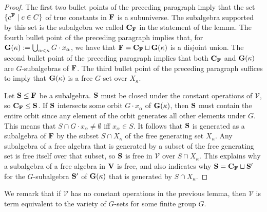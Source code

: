 \documentclass[12pt]{amsart}
\theoremstyle{definition}
\numberwithin{equation}{section}
\newcommand{\m}[1]{{\mathbf{\uppercase{#1}}}}
\begin{document}
\begin{proof}
The first two bullet points of the preceding paragraph
imply that the set $\{c^{\m f}\;|\;c\in C\}$ of true
constants in $\m f$ is a subuniverse.
The subalgebra supported by this set is the subalgebra we called
$\m c_{\m f}$ in the statement of the lemma.
The fourth bullet point of the preceding paragraph
implies that, for $\m g(\kappa):=\bigcup_{\alpha<\kappa} G\cdot x_{\alpha}$,
we have that
$\m f = \m c_{\m f}\sqcup \m g(\kappa)$
is a disjoint union. The second bullet point of the preceding paragraph
implies that both $\m c_{\m f}$ and $\m g(\kappa)$
are $G$-subalgebras of $\m f$. The third
bullet point of the preceding paragraph suffices to imply that
$\m g(\kappa)$
is a free $G$-set over
$X_{\kappa}$.

Let $\m s\leq \m f$ be a subalgebra. $\m s$ must be closed under
the constant operations of $\mathcal{V}$,
so $\m c_{\m f}\leq \m s$. If $\m s$ intersects
some orbit $G\cdot x_{\alpha}$ of $\m g(\kappa)$,
then $\m s$ must contain the entire orbit
since any element of the orbit generates
all other elements under $G$.
This means that $S\cap G\cdot x_{\alpha}\neq \emptyset$ iff
$x_{\alpha}\in S$. It follows that
$\m s$ is generated as a subalgebra of $\m f$
by the subset $S\cap X_{\kappa}$ of the free generating
set $X_{\kappa}$.
Any subalgebra of a free algebra that
is generated by a subset of the free generating set is free
itself over that subset, so $\m s$ is free in $\mathcal{V}$
over $S\cap X_{\kappa}$. This explains why
a subalgebra of a free algebra in $\m v$ is free,
and also indicates why
$\m s = \m c_{\m f}\sqcup {\m s}'$ for the
$G$-subalgebra ${\m s}'$ of $\m g(\kappa)$ that is generated by
$S\cap X_{\kappa}$. 
\end{proof}

We remark that if $\mathcal{V}$ has no constant
operations in the previous lemma, then
$\mathcal{V}$ is term equivalent to the variety
of $G$-sets for some finite group $G$.
\end{document}
